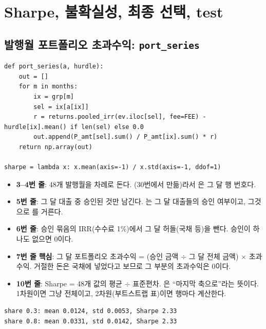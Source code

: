 \chapter{Sharpe, 불확실성, 최종 선택, test}

\section{발행월 포트폴리오 초과수익: \texttt{port\_series}}
\begin{lstlisting}
def port_series(a, hurdle):
    out = []
    for m in months:
        ix = grp[m]
        sel = ix[a[ix]]
        r = returns.pooled_irr(ev.iloc[sel], fee=FEE) - hurdle[ix].mean() if len(sel) else 0.0
        out.append(P_amt[sel].sum() / P_amt[ix].sum() * r)
    return np.array(out)

sharpe = lambda x: x.mean(axis=-1) / x.std(axis=-1, ddof=1)
\end{lstlisting}
\begin{itemize}[leftmargin=*]
\item \textbf{3--4번 줄}: 48개 발행월을 차례로 돈다. (30번에서 만듦)라서 은 그 달 행 번호다.
\item \textbf{5번 줄}: 그 달 대출 중 승인된 것만 남긴다. 는 그 달 대출들의 승인 여부이고, 그것으로 를 거른다.
\item \textbf{6번 줄}: 승인 묶음의 IRR(수수료 1\%)에서 그 달 허들(국채 등)을 뺀다. 승인이 하나도 없으면 0이다.
\item \textbf{7번 줄} \textbf{핵심}: 그 달 포트폴리오 초과수익 = (승인 금액 \ensuremath{\div} 그 달 전체 금액) \ensuremath{\times} 초과수익. 거절한 돈은 국채에 넣었다고 보므로 그 부분의 초과수익은 0이다.
\item \textbf{10번 줄}: Sharpe = 48개 값의 평균 \ensuremath{\div} 표준편차. 은 ``마지막 축으로''라는 뜻이다. 1차원이면 그냥 전체이고, 2차원(부트스트랩 표)이면 행마다 계산한다.
\end{itemize}
\begin{workout}
\begin{lstlisting}[style=out]
share 0.3: mean 0.0124, std 0.0053, Sharpe 2.33
share 0.8: mean 0.0331, std 0.0142, Sharpe 2.33
\end{lstlisting}
\end{workout}

